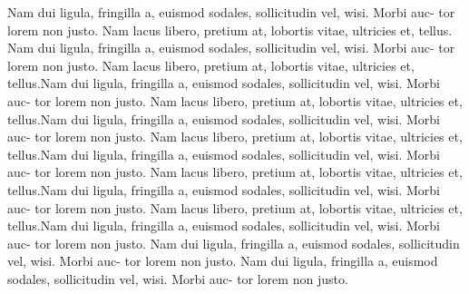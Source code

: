 \documentclass[a4paper]{article}  %
\theoremstyle{MyLineTheoremStyle} %
\theoremstyle{MyBlockTheoremStyle} %
\theoremstyle{MySubsubsectionStyle} %
\begin{document}
\begin{multicols*}{4}
Nam dui ligula, fringilla a, euismod sodales, sollicitudin vel, wisi. Morbi auc-
tor lorem non justo. Nam lacus libero, pretium at, lobortis vitae, ultricies et, tellus.
Nam dui ligula, fringilla a, euismod sodales, sollicitudin vel, wisi. Morbi auc-
tor lorem non justo. Nam lacus libero, pretium at, lobortis vitae, ultricies et, tellus.Nam dui ligula, fringilla a, euismod sodales, sollicitudin vel, wisi. Morbi auc-
tor lorem non justo. Nam lacus libero, pretium at, lobortis vitae, ultricies et, tellus.Nam dui ligula, fringilla a, euismod sodales, sollicitudin vel, wisi. Morbi auc-
tor lorem non justo. Nam lacus libero, pretium at, lobortis vitae, ultricies et, tellus.Nam dui ligula, fringilla a, euismod sodales, sollicitudin vel, wisi. Morbi auc-
tor lorem non justo. Nam lacus libero, pretium at, lobortis vitae, ultricies et, tellus.Nam dui ligula, fringilla a, euismod sodales, sollicitudin vel, wisi. Morbi auc-
tor lorem non justo. Nam lacus libero, pretium at, lobortis vitae, ultricies et, tellus.Nam dui ligula, fringilla a, euismod sodales, sollicitudin vel, wisi. Morbi auc-
tor lorem non justo. Nam dui ligula, fringilla a, euismod sodales, sollicitudin vel, wisi. Morbi auc-
tor lorem non justo. Nam dui ligula, fringilla a, euismod sodales, sollicitudin vel, wisi. Morbi auc-
tor lorem non justo. 















\end{multicols*}  
\end{document}
